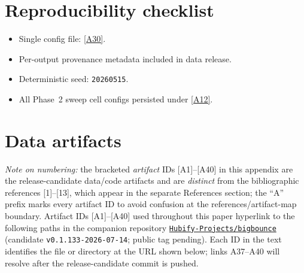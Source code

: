 \documentclass[aps,prd,twocolumn,superscriptaddress,showpacs,preprintnumbers,nofootinbib,longbibliography,floatfix]{revtex4-2}
\newcommand{\repoBase}{https://github.com/Hubify-Projects/bigbounce/blob/main}
\newcommand{\paperVersion}{v0.1.133-2026-07-14}
\begin{document}
\clearpage
\section*{Reproducibility checklist}
\begin{itemize}
\item Single config file:
\href{\repoBase/pipelines/p5\_desi\_chirality/env\_finder/config.yaml}{[A30]}.
\item Per-output provenance metadata included in data release.
\item Deterministic seed: \texttt{20260515}.
\item All Phase~2 sweep cell configs persisted under
\href{\repoBase/pipelines/p5\_desi\_chirality/data/desi\_env/phase2\_sweep}{[A12]}.
\end{itemize}

\section{Data artifacts}\label{app:artifacts}

\emph{Note on numbering:} the bracketed \emph{artifact} IDs
[A1]--[A40] in this appendix are the release-candidate data/code
artifacts and are \emph{distinct} from the bibliographic references
[1]--[13], which appear in the separate References section; the ``A''
prefix marks every artifact ID to avoid confusion at the
references/artifact-map boundary. Artifact IDs [A1]--[A40] used
throughout this paper hyperlink to the following paths in the companion
repository
\href{https://github.com/Hubify-Projects/bigbounce}{\texttt{Hubify-Projects/bigbounce}}
(candidate \texttt{\paperVersion}; public tag pending). Each ID in the
text identifies the file or directory at the URL shown below; links A37--A40
will resolve after the release-candidate commit is pushed.
\end{document}
